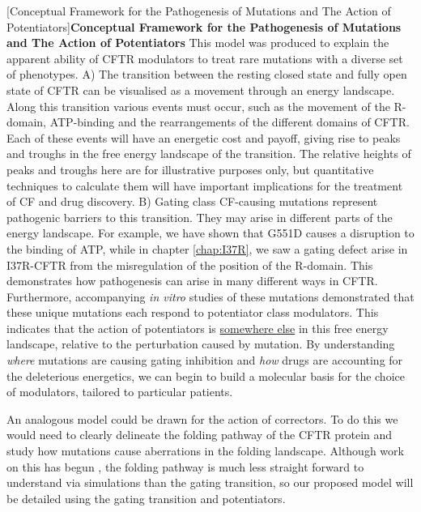 	[Conceptual Framework for the Pathogenesis of Mutations and The Action of Potentiators]{\textbf{Conceptual Framework for the Pathogenesis of Mutations and The Action of Potentiators}{ This model was produced to explain the apparent ability of CFTR modulators to treat rare mutations with a diverse set of phenotypes. A) The transition between the resting closed state and fully open state of CFTR can be visualised as a movement through an energy landscape. Along this transition various events must occur, such as the movement of the R-domain, ATP-binding and the rearrangements of the different domains of CFTR. Each of these events will have an energetic cost and payoff, giving rise to peaks and troughs in the free energy landscape of the transition. The relative heights of peaks and troughs here are for illustrative purposes only, but quantitative techniques to calculate them will have important implications for the treatment of CF and drug discovery. B) Gating class CF-causing mutations represent pathogenic barriers to this transition. They may arise in different parts of the energy landscape. For example, we have shown that G551D causes a disruption to the binding of ATP, while in chapter \ref{chap:I37R}, we saw a gating defect arise in I37R-CFTR from the misregulation of the position of the R-domain. This demonstrates how pathogenesis can arise in many different ways in CFTR. Furthermore, accompanying \textit{in vitro} studies of these mutations demonstrated that these unique mutations each respond to potentiator class modulators. This indicates that the action of potentiators is \underline{somewhere else} in this free energy landscape, relative to the perturbation caused by mutation. By understanding \textit{where} mutations are causing gating inhibition and \textit{how} drugs are accounting for the deleterious energetics, we can begin to build a molecular basis for the choice of modulators, tailored to particular patients.}}
	\label{drug_action_model}

	\endgroup


An analogous model could be drawn for the action of correctors. To do this we would need to clearly delineate the folding pathway of the CFTR protein and study how mutations cause aberrations in the folding landscape. Although work on this has begun \cite{krainer2018, kleizen2021, kleizen2020, fiedorczuk2022}, the folding pathway is much less straight forward to understand via simulations than the gating transition, so our proposed model will be detailed using the gating transition and potentiators.

